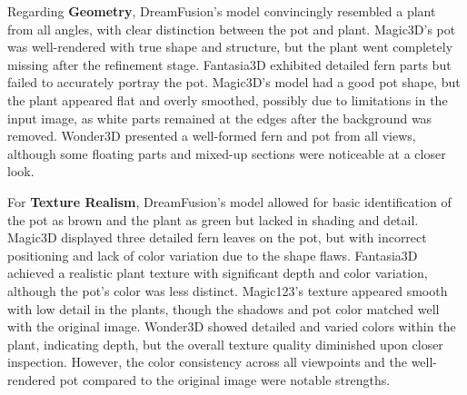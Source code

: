 Regarding \textbf{Geometry}, DreamFusion's model convincingly resembled a plant from all angles, with clear distinction between the pot and plant. Magic3D's pot was well-rendered with true shape and structure, but the plant went completely missing after the refinement stage. Fantasia3D exhibited detailed fern parts but failed to accurately portray the pot. Magic3D's model had a good pot shape, but the plant appeared flat and overly smoothed, possibly due to limitations in the input image, as white parts remained at the edges after the background was removed. Wonder3D presented a well-formed fern and pot from all views, although some floating parts and mixed-up sections were noticeable at a closer look.

For \textbf{Texture Realism}, DreamFusion's model allowed for basic identification of the pot as brown and the plant as green but lacked in shading and detail. Magic3D displayed three detailed fern leaves on the pot, but with incorrect positioning and lack of color variation due to the shape flaws. Fantasia3D achieved a realistic plant texture with significant depth and color variation, although the pot's color was less distinct. Magic123's texture appeared smooth with low detail in the plants, though the shadows and pot color matched well with the original image. Wonder3D showed detailed and varied colors within the plant, indicating depth, but the overall texture quality diminished upon closer inspection. However, the color consistency across all viewpoints and the well-rendered pot compared to the original image were notable strengths.

